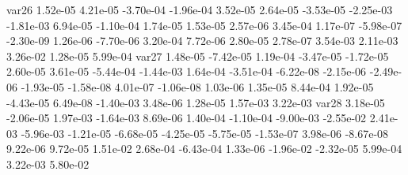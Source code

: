 var26  1.52e-05  4.21e-05 -3.70e-04 -1.96e-04  3.52e-05  2.64e-05 -3.53e-05 -2.25e-03 -1.81e-03  6.94e-05 -1.10e-04  1.74e-05  1.53e-05  2.57e-06  3.45e-04  1.17e-07 -5.98e-07 -2.30e-09  1.26e-06 -7.70e-06  3.20e-04  7.72e-06  2.80e-05  2.78e-07  3.54e-03  2.11e-03  3.26e-02  1.28e-05  5.99e-04
var27  1.48e-05 -7.42e-05  1.19e-04 -3.47e-05 -1.72e-05  2.60e-05  3.61e-05 -5.44e-04 -1.44e-03  1.64e-04 -3.51e-04 -6.22e-08 -2.15e-06 -2.49e-06 -1.93e-05 -1.58e-08  4.01e-07 -1.06e-08  1.03e-06  1.35e-05  8.44e-04  1.92e-05 -4.43e-05  6.49e-08 -1.40e-03  3.48e-06  1.28e-05  1.57e-03  3.22e-03
var28  3.18e-05 -2.06e-05  1.97e-03 -1.64e-03  8.69e-06  1.40e-04 -1.10e-04 -9.00e-03 -2.55e-02  2.41e-03 -5.96e-03 -1.21e-05 -6.68e-05 -4.25e-05 -5.75e-05 -1.53e-07  3.98e-06 -8.67e-08  9.22e-06  9.72e-05  1.51e-02  2.68e-04 -6.43e-04  1.33e-06 -1.96e-02 -2.32e-05  5.99e-04  3.22e-03  5.80e-02





